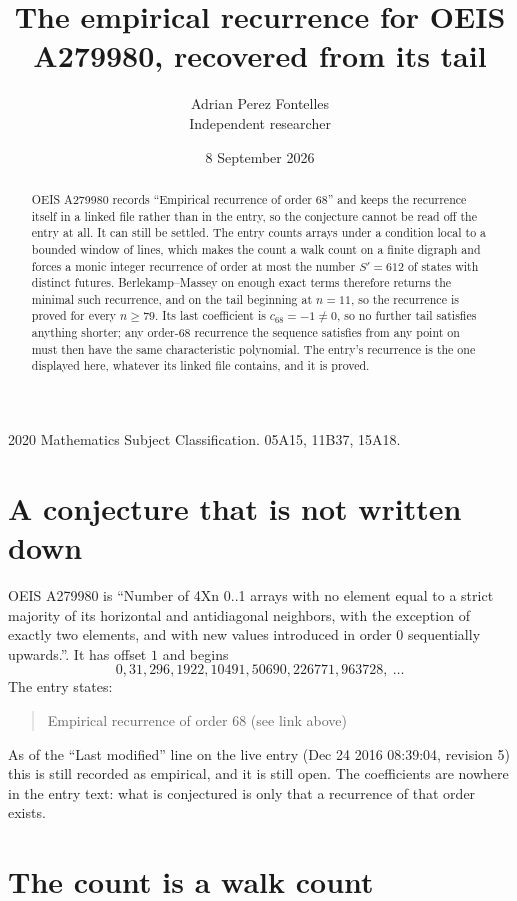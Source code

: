 \documentclass[11pt,a4paper]{article}
\title{The empirical recurrence for OEIS A279980, recovered from its tail}
\author{Adrian Perez Fontelles\\ \small Independent researcher}
\date{8 September 2026}
\theoremstyle{plain}
\theoremstyle{definition}
\begin{document}
\maketitle

\begin{abstract}
OEIS A279980 records ``Empirical recurrence of order $68$'' and keeps the recurrence itself in
a linked file rather than in the entry, so the conjecture cannot be read off the entry at all.
It can still be settled. The entry counts arrays under a condition local to a bounded window of
lines, which makes the count a walk count on a finite digraph and forces a monic integer
recurrence of order at most the number $S'=612$ of states with distinct futures. Berlekamp--Massey on
enough exact terms therefore returns the minimal such recurrence, and on the tail beginning at $n=11$, so the recurrence is proved for every $n\ge79$.
Its last coefficient is $c_{68}=-1\neq0$, so no further tail satisfies anything
shorter; any order-$68$ recurrence the sequence satisfies from any point on must then have
the same characteristic polynomial. The entry's recurrence is the one displayed here, whatever
its linked file contains, and it is proved.
\end{abstract}

\noindent\small 2020 Mathematics Subject Classification. 05A15, 11B37, 15A18.\normalsize

\section{A conjecture that is not written down}

OEIS A279980 is ``Number of 4Xn 0..1 arrays with no element equal to a strict majority of its horizontal and antidiagonal neighbors, with the exception of exactly two elements, and with new values introduced in order 0 sequentially upwards.''. It has offset $1$ and begins
\[
0, 31, 296, 1922, 10491, 50690, 226771, 963728,\ \dots
\]
The entry states:
\begin{quote}
Empirical recurrence of order 68 (see link above)
\end{quote}
As of the ``Last modified'' line on the live entry (Dec 24 2016 08:39:04, revision 5)
this is still recorded as empirical, and it is still open. The coefficients are nowhere in the
entry text: what is conjectured is only that a recurrence of that order exists.

\section{The count is a walk count}
\end{document}
